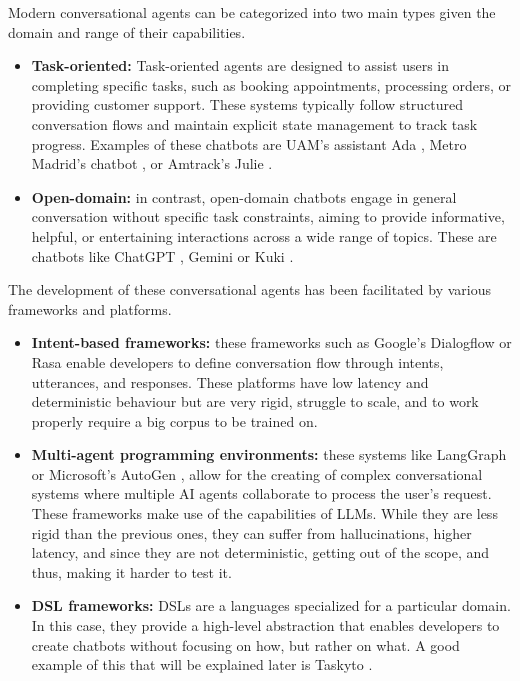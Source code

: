 Modern conversational agents can be categorized into two main types
given the domain and range of their capabilities.
\begin{itemize}
  \item \textbf{Task-oriented:}
    Task-oriented agents are designed to assist users in completing specific tasks,
    such as booking appointments, processing orders, or providing customer support.
    These systems typically follow structured conversation flows
    and maintain explicit state management to track task progress.
    Examples of these chatbots are
    UAM's assistant Ada \autocite{AdaUAM},
    Metro Madrid's chatbot \autocite{MetroMadridEmpleara2025},
    or Amtrack's Julie \autocite{MeetJulieYour}.

  \item \textbf{Open-domain:}
    in contrast, open-domain chatbots
    engage in general conversation without specific task constraints,
    aiming to provide informative, helpful, or entertaining interactions across a wide range of topics.
    These are chatbots like ChatGPT \autocite{ChatGPT},
    Gemini \autocite{GoogleGemini} or Kuki \autocite{Kuki_ai}.
\end{itemize}

The development of these conversational agents
has been facilitated by various frameworks and platforms.
\begin{itemize}
  \item \textbf{Intent-based frameworks:}
    these frameworks such as Google's Dialogflow \autocite{Dialogflow} or Rasa \autocite{Rasa2020}
    enable developers to define conversation flow through intents, utterances, and responses.
    These platforms have low latency and deterministic behaviour
    but are very rigid, struggle to scale,
    and to work properly require a big corpus to be trained on.

  \item \textbf{Multi-agent programming environments:}
    these systems like LangGraph \autocite{LangGraph} or Microsoft's AutoGen \autocite{AutoGen},
    allow for the creating of complex conversational systems
    where multiple \ac{AI} agents collaborate to process the user's request.
    These frameworks make use of the capabilities of \acp{LLM}.
    While they are less rigid than the previous ones,
    they can suffer from hallucinations,
    higher latency, and since they are not deterministic,
    getting out of the scope, and thus, making it harder to test it.

  \item \textbf{\ac{DSL} frameworks:}
    \acp{DSL} are a languages specialized for a particular domain.
    In this case, they provide a high-level abstraction
    that enables developers to create chatbots
    without focusing on how, but rather on what.
    A good example of this that will be explained later is Taskyto
    \autocite{sanchezcuadradoAutomatingDevelopmentTaskoriented2024}.
\end{itemize}

